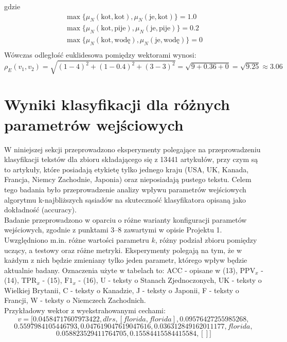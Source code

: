 \documentclass{article}
\begin{document}
gdzie
\[
\begin{aligned}
\max \{\mu_N(\text{kot}, \text{kot}), \mu_N(\text{je}, \text{kot})\} = 1.0 \\
\max \{\mu_N(\text{kot}, \text{pije}), \mu_N(\text{je}, \text{pije})\} = 0.2 \\
\max \{\mu_N(\text{kot}, \text{wodę}), \mu_N(\text{je}, \text{wodę})\} = 0 \\
\end{aligned}
\]
Wówczas odległość euklidesowa pomiędzy wektorami wynosi:
\[
\rho_E(v_1, v_2) = \sqrt{(1 - 4)^2 + (1 - 0.4)^2 + (3 - 3)^2} = \sqrt{9 + 0.36 + 0} = \sqrt{9.25} \approx 3.06
\]

\section{Wyniki klasyfikacji dla różnych parametrów wejściowych}
W niniejszej sekcji przeprowadzono eksperymenty polegające na przeprowadzeniu klasyfikacji tekstów dla zbioru składającego się z 13441 artykułów, przy czym są to artykuły, które posiadają etykietę tylko jednego kraju (USA, UK, Kanada, Francja, Niemcy Zachodnie, Japonia) oraz nieposiadają pustego tekstu. Celem tego badania było przeprowadzenie analizy wpływu parametrów wejściowych algorytmu k-najbliższych sąsiadów na skuteczność klasyfikatora opisaną jako dokładność (accuracy). \\
Badanie przeprowadzono w oparciu o różne warianty konfiguracji parametów wejściowych, zgodnie z punktami 3–8 zawartymi w opisie Projektu 1. Uwzględniono m.in. różne wartości parametru \(k\), różny podział zbioru pomiędzy uczący, a testowy oraz różne metryki. Eksperymenty polegają na tym, że w każdym z nich będzie zmieniany tylko jeden parametr, którego wpływ będzie aktualnie badany.
Oznaczenia użyte w tabelach to: ACC - opisane w (13),  \( \text{PPV}_x \) - (14), \( \text{TPR}_x \) - (15), \( \text{F1}_x \) - (16), U - teksty o Stanach Zjednoczonych, UK - teksty o Wielkiej Brytanii, C - teksty o Kanadzie, J - teksty o Japonii, F - teksty o Francji, W - teksty o Niemczech Zachodnich.
\\
Przykładowy wektor z wyekstrahowanymi cechami:
\[
    v = [ 0.04584717607973422, dlrs, [ florida, florida], 0.09576427255985268,
\]
\[
     0.5597984105446793, 0.047619047619047616, 0.036312849162011177, florida,
\]
\[
     0.058823529411764705, 0.15584415584415584, [] ]
\]
\end{document}
